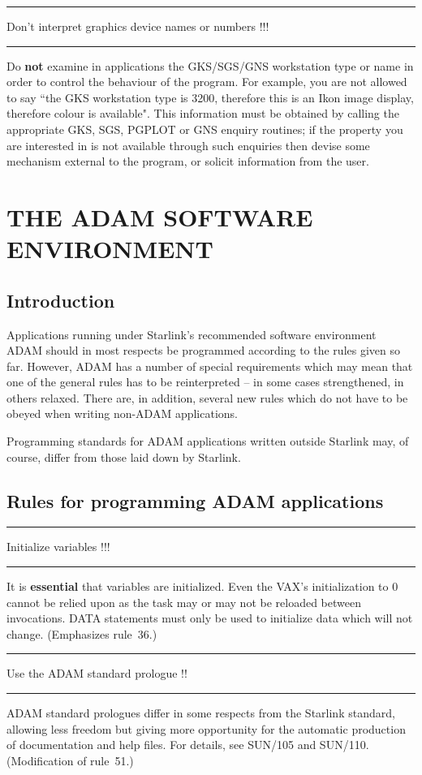 \documentclass[twoside,11pt]{article}
\newcounter{sruleno}
\newcommand{\srule}[1]{
    \addtocounter{sruleno}{1}
    \goodbreak
    \rule[0.5ex]{\textwidth}{0.3mm}
    {\Large #1 \hfill {\thesruleno}}
    \rule[0.5ex]{\textwidth}{0.1mm}
}
\newcommand{\srule}[1]{
       \addtocounter{sruleno}{1}
       \begin{rawhtml} <HR> \end{rawhtml}
       {\Large \thesruleno}~~~~{\Large #1}
       \begin{rawhtml} <HR> \end{rawhtml}
       \end{tabular}
  }
\renewcommand{\_}{{\tt\char'137}}
\begin{document}
\srule{Don't interpret graphics device names or numbers !!!}
Do {\bf not} examine in applications the GKS/SGS/GNS workstation
type or name in order to control the behaviour of the
program.  For example, you are not allowed to say ``the
GKS workstation type is 3200, therefore this is an
Ikon image display, therefore colour is available".  This
information must be obtained by calling the appropriate
GKS, SGS, \mbox{PGPLOT} or GNS enquiry routines;  if the property
you are interested in is not available through such
enquiries then devise some mechanism external to the
program, or solicit information from the user.

\newpage
\section{THE ADAM SOFTWARE ENVIRONMENT}

\subsection{Introduction}
Applications running under Starlink's recommended software
environment ADAM should in most respects be programmed
according to the rules given so far.  However, ADAM has a number
of special requirements which may mean that one of the
general rules has to be reinterpreted -- in some cases
strengthened, in others relaxed.  There are, in addition,
several new rules which do not have to be obeyed when
writing non-ADAM applications.

Programming standards for ADAM applications written outside
Starlink may, of course, differ from those laid down by Starlink.

\goodbreak
\subsection{Rules for programming ADAM applications}

\srule{Initialize variables !!!}
It is {\bf essential} that variables are initialized.
Even the VAX's initialization to 0 cannot be relied upon as the task may or
may not be reloaded between invocations.
DATA statements must only be used to initialize data which will not change. 
(Emphasizes rule~36.)

\srule{Use the ADAM standard prologue !!}
ADAM standard prologues differ in some respects from the Starlink
standard, allowing less freedom but giving more opportunity for
the automatic production of documentation and help files.
For details, see SUN/105 and SUN/110.
(Modification of rule~51.)
\end{document}
